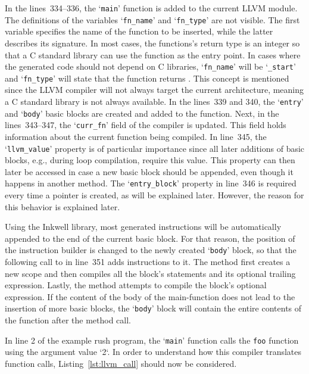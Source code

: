 In the lines~334--336, the `\texttt{main}' function is added to the current LLVM module.
The definitions of the variables `\texttt{fn\_name}' and `\texttt{fn\_type}' are not visible.
The first variable specifies the name of the function to be inserted, while the latter describes its signature.
In most cases, the  functions's return type is an integer so that a C standard library can use the function as the entry point.
In cases where the generated code should not depend on C libraries, `\Verb|fn_name|' will be `\Verb|_start|' and `\Verb|fn_type|' will state that the function returns .
This concept is mentioned since the LLVM compiler will not always target the current architecture,
meaning a C standard library is not always available.
In the lines~339 and 340, the `\texttt{entry}' and `\texttt{body}' basic blocks are created and added to the function.
Next, in the lines~343--347, the `\Verb|curr_fn|' field of the compiler is updated.
This field holds information about the current function being compiled.
In line~345, the `\Verb|llvm_value|' property is of particular importance since all later additions of basic blocks, e.g., during loop compilation, require this value.
This property can then later be accessed in case a new basic block should be appended, even though it happens in another method.
The `\Verb|entry_block|' property in line~346 is required every time a pointer is created, as will be explained later.
However, the reason for this behavior is explained later.

Using the Inkwell library, most generated instructions will be automatically appended to the end of the current basic block.
For that reason, the position of the instruction builder is changed to the newly created `\texttt{body}' block,
so that the following call to  in line~351 adds instructions to it.
The  method first creates a new scope and then compiles all the block's statements and its optional trailing expression.
Lastly, the method attempts to compile the block's optional expression.
If the content of the body of the main-function does not lead to the insertion of more basic blocks,
the `\texttt{body}' block will contain the entire contents of the function after the method call.

In line 2 of the example rush program, the `\texttt{main}' function calls the \texttt{foo} function using the argument value `2`.
In order to understand how this compiler translates function calls, Listing~\ref{lst:llvm_call} should now be considered.

